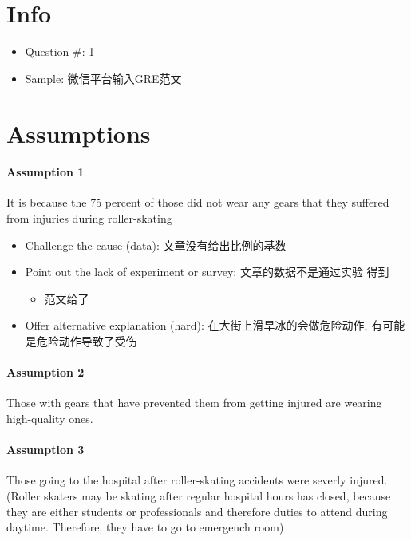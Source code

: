 \documentclass{article}
\begin{document}
  \section{Info}
    \begin{itemize}
      \item Question \#: 1
      \item Sample: 微信平台输入GRE范文
    \end{itemize}

  \section{Assumptions}

    \paragraph{Assumption 1} It is because the 75 percent of those did not
    wear any gears that they suffered from injuries during roller-skating
    \begin{itemize}
      \item Challenge the cause (data): 文章没有给出比例的基数
      \item Point out the lack of experiment or survey: 文章的数据不是通过实验
      得到
      \begin{itemize}
        \item 范文给了
      \end{itemize}

      \item Offer alternative explanation (hard): 在大街上滑旱冰的会做危险动作,
      有可能是危险动作导致了受伤
    \end{itemize}

    \paragraph{Assumption 2} Those with gears that have prevented them from
    getting injured are wearing high-quality ones.

    \paragraph{Assumption 3} Those going to the hospital after roller-skating
    accidents were severly injured. (Roller skaters may be skating after
    regular hospital hours has closed, because they are either students
    or professionals and therefore duties to attend during daytime. Therefore,
    they have to go to emergench room)
\end{document}
